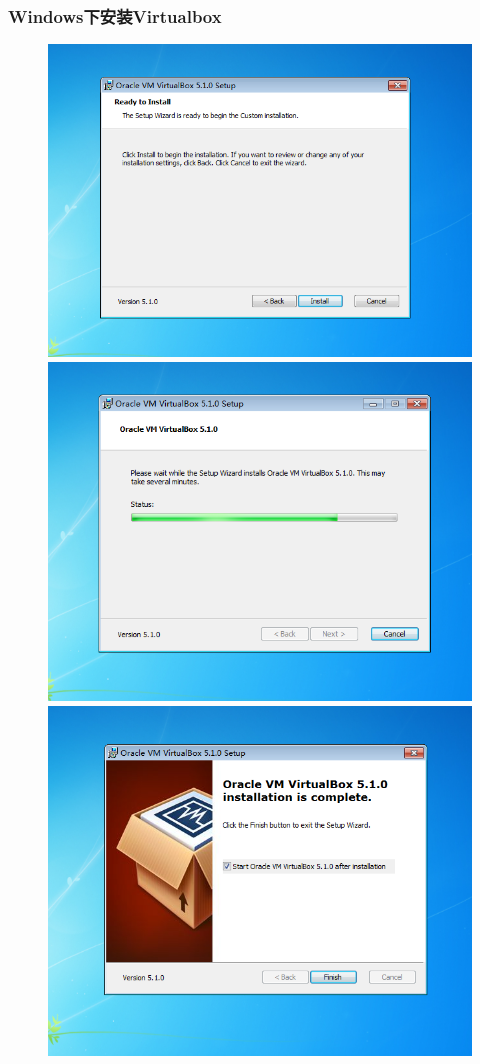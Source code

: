 \frame
{
	\frametitle{\textrm{Windows}下安装\textrm{Virtualbox}}
\begin{figure}[h!]
\centering
\vspace{-11.5pt}
\includegraphics[height=0.34\textwidth]{Figures/Virtualbox-install-5.png}
\hskip 1pt
\includegraphics[height=0.34\textwidth]{Figures/Virtualbox-install-6.png}
\includegraphics[height=0.34\textwidth]{Figures/Virtualbox-install-7.png}
\caption{\textrm{\fontsize{6.2pt}{5.2pt}\selectfont{The install step-4 of Virtualbox.}}}
\label{Virtualbox-install-4}
\end{figure}
}

